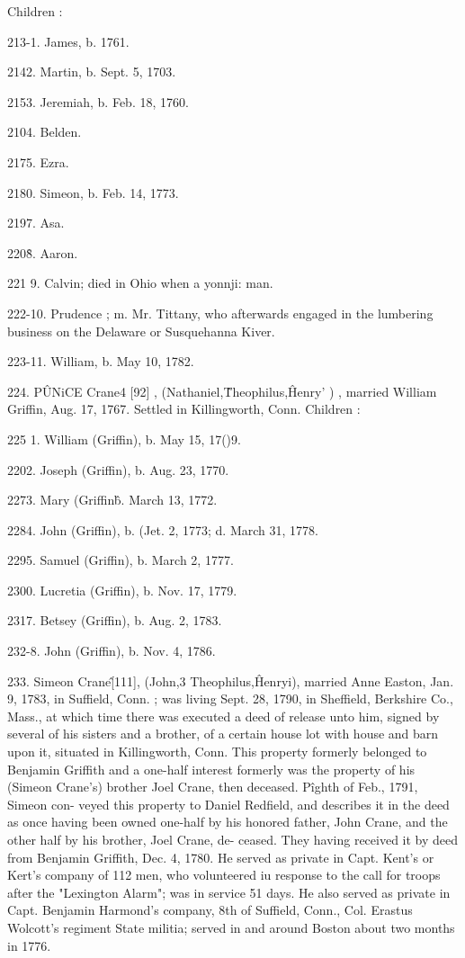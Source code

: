 \documentclass{book}
\begin{document}
Children : 

213-1. James, b. 1761. 

2142. Martin, b. Sept. 5, 1703. 

2153. Jeremiah, b. Feb. 18, 1760. 

2104. Belden. 

2175. Ezra. 

2180. Simeon, b. Feb. 14, 1773. 

2197. Asa. 

220\^8. Aaron. 

221  9. Calvin; died in Ohio when a yonnji: man. 

222-10. Prudence ; m. Mr. Tittany, who afterwards engaged in the 
lumbering business on the Delaware or Susquehanna Kiver. 

223-11. William, b. May 10, 1782. 

224. P\^UNiCE Crane4 [92] , (Nathaniel,\^ Theophilus,\^ Henry' ) , 
married William Griffin, Aug. 17, 1767. Settled in Killingworth, 
Conn. Children : 

225  1. William (Griffin), b. May 15, 17()9. 

2202. Joseph (Griffin), b. Aug. 23, 1770. 

2273. Mary (Griffin\^ b. March 13, 1772. 

2284. John (Griffin), b. (Jet. 2, 1773; d. March 31, 1778. 

2295. Samuel (Griffin), b. March 2, 1777. 

2300. Lucretia (Griffin), b. Nov. 17, 1779. 

2317. Betsey (Griffin), b. Aug. 2, 1783. 

232-8. John (Griffin), b. Nov. 4, 1786. 

233. Simeon Crane\^ [111], (John,3 Theophilus,\^ Henryi), 
married Anne Easton, Jan. 9, 1783, in Suffield, Conn. ; was 
living Sept. 28, 1790, in Sheffield, Berkshire Co., Mass., at 
which time there was executed a deed of release unto him, signed 
by several of his sisters and a brother, of a certain house lot with 
house and barn upon it, situated in Killingworth, Conn. This 
property formerly belonged to Benjamin Griffith and a one-half 
interest formerly was the property of his (Simeon Crane's) brother 
Joel Crane, then deceased. P\^ighth of Feb., 1791, Simeon con- 
veyed this property to Daniel Redfield, and describes it in the 
deed as once having been owned one-half by his honored father, 
John Crane, and the other half by his brother, Joel Crane, de- 
ceased. They having received it by deed from Benjamin Griffith, 
Dec. 4, 1780. He served as private in Capt. Kent's or Kert's 
company of 112 men, who volunteered iu response to the call for 
troops after the "Lexington Alarm"; was in service 51 days. 
He also served as private in Capt. Benjamin Harmond's company, 
8th of Suffield, Conn., Col. Erastus Wolcott's regiment State 
militia; served in and around Boston about two months in 1776. 
\end{document}
